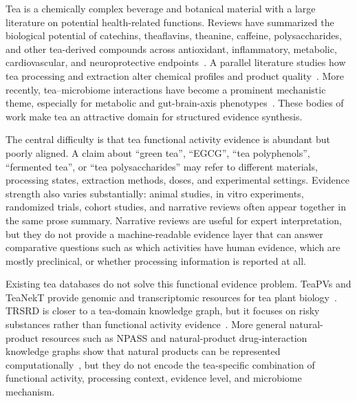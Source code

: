 \documentclass[11pt]{article}
\begin{document}
Tea is a chemically complex beverage and botanical material with a large literature on potential health-related functions. Reviews have summarized the biological potential of catechins, theaflavins, theanine, caffeine, polysaccharides, and other tea-derived compounds across antioxidant, inflammatory, metabolic, cardiovascular, and neuroprotective endpoints~\cite{luo2024tea_bioactive_review,yang2025bioavailability_tea_polyphenols,rashwan2025tea_polysaccharides_review}. A parallel literature studies how tea processing and extraction alter chemical profiles and product quality~\cite{raghunath2023tea_extraction_review,aaqil2023black_tea_processing_review,wang2024processing_metabolomics}. More recently, tea--microbiome interactions have become a prominent mechanistic theme, especially for metabolic and gut-brain-axis phenotypes~\cite{zhao2024processed_tea_microbiota,song2024oolong_neuroprotection,tian2024obesity_microbiota}. These bodies of work make tea an attractive domain for structured evidence synthesis.

The central difficulty is that tea functional activity evidence is abundant but poorly aligned. A claim about ``green tea'', ``EGCG'', ``tea polyphenols'', ``fermented tea'', or ``tea polysaccharides'' may refer to different materials, processing states, extraction methods, doses, and experimental settings. Evidence strength also varies substantially: animal studies, in vitro experiments, randomized trials, cohort studies, and narrative reviews often appear together in the same prose summary. Narrative reviews are useful for expert interpretation, but they do not provide a machine-readable evidence layer that can answer comparative questions such as which activities have human evidence, which are mostly preclinical, or whether processing information is reported at all.

Existing tea databases do not solve this functional evidence problem. TeaPVs and TeaNekT provide genomic and transcriptomic resources for tea plant biology~\cite{an2022teapvs,zheng2024teanekt}. TRSRD is closer to a tea-domain knowledge graph, but it focuses on risky substances rather than functional activity evidence~\cite{wang2023trsrd}. More general natural-product resources such as NPASS and natural-product drug-interaction knowledge graphs show that natural products can be represented computationally~\cite{zhao2023npass_update,taneja2023npdi_kg}, but they do not encode the tea-specific combination of functional activity, processing context, evidence level, and microbiome mechanism.
\end{document}
